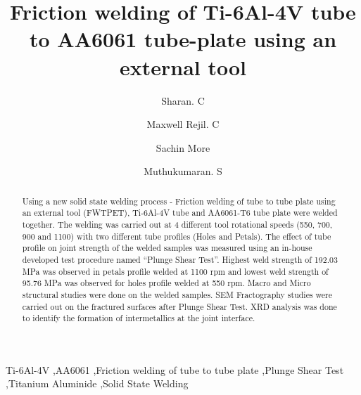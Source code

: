 \documentclass[3p]{elsarticle}
\begin{document}
\newcommand{\degree}{\ensuremath{^{\circ}}}  %

\begin{frontmatter}

\title{Friction welding of Ti-6Al-4V tube to AA6061 tube-plate using an external tool}

\author[META]{Sharan. C}
\author[META]{Maxwell Rejil. C}
\author[META]{Sachin More}
\author[META]{Muthukumaran. S}


\address[META]{Department of Metallurgical and Materials Engineering, National Institute of Technology, Tiruchirappalli-620015, India}
         
\begin{abstract}
Using a new solid state welding process - Friction welding of tube to tube plate using an external tool (FWTPET), Ti-6Al-4V tube and AA6061-T6 tube plate were welded together. The welding was carried out at 4 different tool rotational speeds (550, 700, 900 and 1100) with two different tube profiles (Holes and Petals). The effect of tube profile on joint strength of the welded samples was measured using an in-house developed test procedure named ``Plunge Shear Test''. Highest weld strength of 192.03 MPa was observed in petals profile welded at 1100 rpm and lowest weld strength of 95.76 MPa was observed for holes profile welded at 550 rpm. Macro and Micro structural studies were done on the welded samples. SEM Fractography studies were carried out on the fractured surfaces after Plunge Shear Test. XRD analysis was done to identify the formation of intermetallics at the joint interface.
\end{abstract}

\begin{keyword}
Ti-6Al-4V \sep AA6061 \sep Friction welding of tube to tube plate \sep Plunge Shear Test \sep Titanium Aluminide \sep  Solid State Welding
\end{keyword}

\end{frontmatter}
\end{document}
